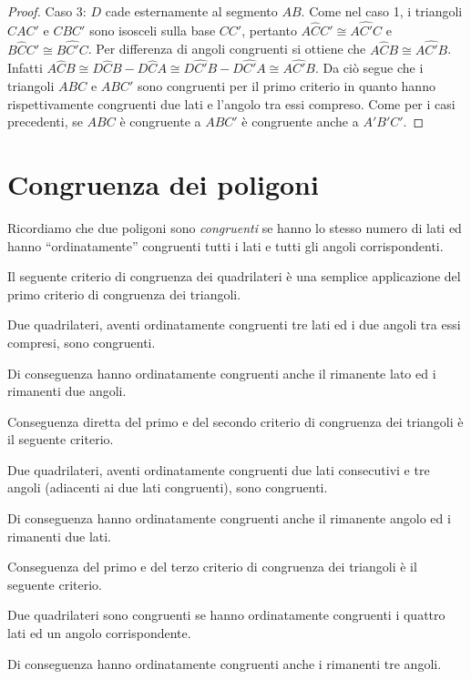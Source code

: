 \begin{proof}
Caso 3: $D$ cade esternamente al segmento $AB$.
Come nel caso 1, i triangoli $CAC'$ e $CBC'$ sono isosceli sulla base $CC'$, pertanto $A\widehat{C}C'\cong A\widehat{C'}C$ e $B\widehat{C}C'\cong B\widehat{C'}C$. Per differenza di angoli congruenti si ottiene che $A\widehat{C}B\cong A\widehat{C'}B$.
Infatti $A\widehat{C}B\cong D\widehat{C}B-D\widehat{C}A\cong D\widehat{C'}B-D\widehat{C'}A\cong A\widehat{C'}B$. Da ciò segue che i triangoli $ABC$ e $ABC'$ sono congruenti per il primo criterio in quanto hanno rispettivamente congruenti due lati e l'angolo tra essi compreso. Come per i casi precedenti, se $ABC$ è congruente a $ABC'$ è congruente anche a $A'B'C'$.
\end{proof}

\section{Congruenza dei poligoni}\label{sect:congruenza_poligoni}

Ricordiamo che due poligoni sono \emph{congruenti} se hanno lo stesso numero di lati ed hanno ``ordinatamente'' congruenti tutti i lati e tutti gli angoli corrispondenti.

Il seguente criterio di congruenza dei quadrilateri è una semplice applicazione del primo criterio di congruenza dei triangoli.
\begin{teorema}
Due quadrilateri, aventi ordinatamente congruenti tre lati ed i due angoli tra essi compresi, sono congruenti.
\end{teorema}
Di conseguenza hanno ordinatamente congruenti anche il rimanente lato ed i rimanenti due angoli.

Conseguenza diretta del primo e del secondo criterio di congruenza dei triangoli è il seguente criterio.
\begin{teorema}
Due quadrilateri, aventi ordinatamente congruenti due lati consecutivi e tre angoli (adiacenti ai due lati congruenti), sono congruenti.
\end{teorema}
Di conseguenza hanno ordinatamente congruenti anche il rimanente angolo ed i rimanenti due lati.

Conseguenza del primo e del terzo criterio di congruenza dei triangoli è il seguente criterio.
\begin{teorema}
Due quadrilateri sono congruenti se hanno ordinatamente congruenti i quattro lati ed un angolo corrispondente.
\end{teorema}
Di conseguenza hanno ordinatamente congruenti anche i rimanenti tre angoli.

